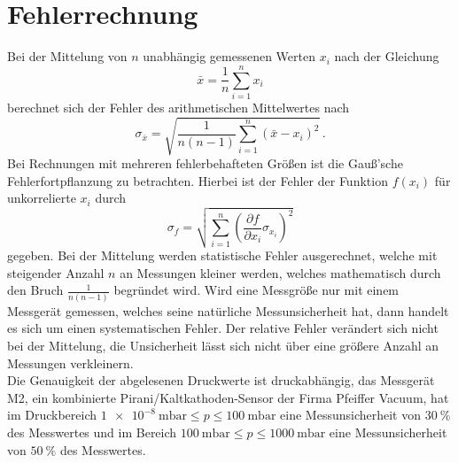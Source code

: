 \section{Fehlerrechnung}
\label{sec:fehler}

\noindent Bei der Mittelung von $n$ unabhängig gemessenen Werten $x_i$ nach der Gleichung 
\begin{equation*}
    \bar{x} = \frac{1}{n} \sum_{i=1}^n x_i
\end{equation*}
berechnet sich der Fehler des arithmetischen Mittelwertes nach
\begin{equation}
    \sigma_{\bar{x}} = \sqrt{\frac{1}{n(n-1)}\sum_{i=1}^n \left( \bar{x} - x_i \right)^2}\, .
    \label{eqn:err_arth_middel}
\end{equation} 
Bei Rechnungen mit mehreren fehlerbehafteten Größen ist die Gauß'sche Fehlerfortpflanzung zu betrachten. Hierbei ist der Fehler der Funktion $f(x_i)$ 
für unkorrelierte $x_i$  durch
\begin{equation}
    \sigma_f = \sqrt{\sum_{i=1}^n \left(\frac{\partial f}{\partial x_i} \sigma_{x_i}\right)^2}
    \label{eqn:gauss}
\end{equation}
gegeben.
Bei der Mittelung werden statistische Fehler ausgerechnet, welche mit steigender Anzahl $n$ an Messungen kleiner werden, welches mathematisch durch den Bruch $\frac{1}{n(n-1)}$ begründet wird. 
Wird eine Messgröße nur mit einem Messgerät gemessen, welches seine natürliche Messunsicherheit hat, dann handelt es sich um einen systematischen Fehler. 
Der relative Fehler verändert sich nicht bei der Mittelung, die Unsicherheit lässt sich nicht über eine größere Anzahl an Messungen verkleinern.\\
Die Genauigkeit der abgelesenen Druckwerte ist druckabhängig, das Messgerät M2, ein kombinierte Pirani/Kaltkathoden-Sensor der Firma Pfeiffer Vacuum, hat im Druckbereich $ \SI{1e-8}{\milli\bar} \leq p \leq \SI{100}{\milli\bar}$ eine Messunsicherheit von 
$\SI{30}{\percent}$ des Messwertes und im Bereich $\SI{100}{\milli\bar} \leq p \leq \SI{1000}{\milli\bar}$ eine Messunsicherheit von $\SI{50}{\percent}$ des Messwertes. 

